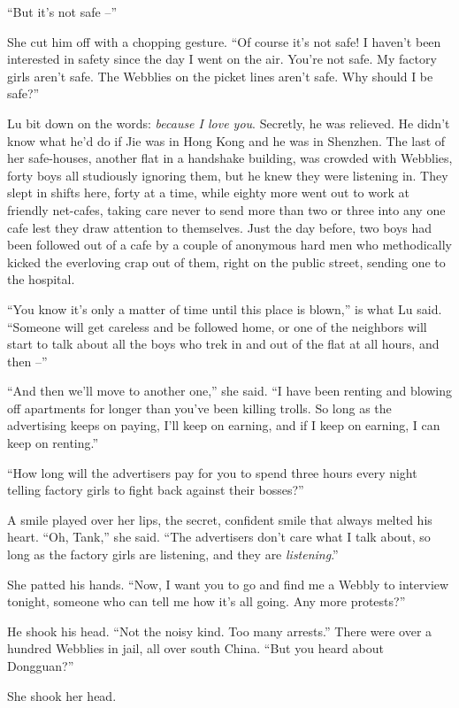 ``But it's not safe --''

She cut him off with a chopping gesture. ``Of course it's not safe!
I haven't been interested in safety since the day I went on the
air. You're not safe. My factory girls aren't safe. The Webblies on
the picket lines aren't safe. Why should I be safe?''

Lu bit down on the words: \emph{because I love you}. Secretly, he
was relieved. He didn't know what he'd do if Jie was in Hong Kong
and he was in Shenzhen. The last of her safe-houses, another flat
in a handshake building, was crowded with Webblies, forty boys all
studiously ignoring them, but he knew they were listening in. They
slept in shifts here, forty at a time, while eighty more went out
to work at friendly net-cafes, taking care never to send more than
two or three into any one cafe lest they draw attention to
themselves. Just the day before, two boys had been followed out of
a cafe by a couple of anonymous hard men who methodically kicked
the everloving crap out of them, right on the public street,
sending one to the hospital.

``You know it's only a matter of time until this place is blown,'' is
what Lu said. ``Someone will get careless and be followed home, or
one of the neighbors will start to talk about all the boys who trek
in and out of the flat at all hours, and then --''

``And then we'll move to another one,'' she said. ``I have been
renting and blowing off apartments for longer than you've been
killing trolls. So long as the advertising keeps on paying, I'll
keep on earning, and if I keep on earning, I can keep on renting.''

``How long will the advertisers pay for you to spend three hours
every night telling factory girls to fight back against their
bosses?''

A smile played over her lips, the secret, confident smile that
always melted his heart. ``Oh, Tank,'' she said. ``The advertisers
don't care what I talk about, so long as the factory girls are
listening, and they are \emph{listening}.''

She patted his hands. ``Now, I want you to go and find me a Webbly
to interview tonight, someone who can tell me how it's all going.
Any more protests?''

He shook his head. ``Not the noisy kind. Too many arrests.'' There
were over a hundred Webblies in jail, all over south China. ``But
you heard about Dongguan?''

She shook her head.

